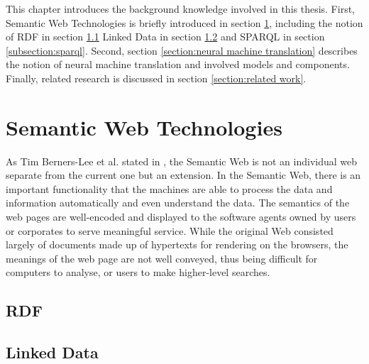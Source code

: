 
This chapter introduces the background knowledge involved in this thesis. First, Semantic Web Technologies is briefly introduced in section \ref{section:semantic web technologies}, including the notion of RDF in section \ref{subsection:rdf} Linked Data in section \ref{subsection:linked data} and SPARQL in section \ref{subsection:sparql}. Second, section \ref{section:neural machine translation} describes the notion of neural machine translation and involved models and components. Finally, related research is discussed in section \ref{section:related work}.

\section{Semantic Web Technologies} \label{section:semantic web technologies}

As Tim Berners-Lee et al. stated in \cite{Berners-Lee2001}, the Semantic Web is not an individual web separate from the current one but an extension. In the Semantic Web, there is an important functionality that the machines are able to process the data and information automatically and even understand the data. The semantics of the web pages are well-encoded and displayed to the software agents owned by users or corporates to serve meaningful service. While the original Web consisted largely of documents made up of hypertexts for rendering on the browsers, the meanings of the web page are not well conveyed, thus being difficult for computers to analyse, or users to make higher-level searches. 




\subsection{RDF} \label{subsection:rdf}

\subsection{Linked Data} \label{subsection:linked data}

